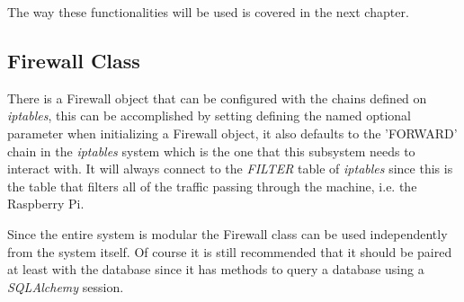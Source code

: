 The way these functionalities will be used is covered in the next chapter.

\subsection{Firewall Class}
\label{chap4:sec:firewall-sys:firewall-class}
There is a Firewall object that can be configured with the chains defined on
\emph{iptables}, this can be accomplished by setting defining the named optional
parameter when initializing a Firewall object, it also defaults to the 'FORWARD'
chain in the \emph{iptables} system which is the one that this subsystem needs
to interact with. It will always connect to the \emph{FILTER} table of
\emph{iptables} since this is the table that filters all of the traffic passing
through the machine, i.e. the Raspberry Pi.

Since the entire system is modular the Firewall class can be used independently
from the system itself. Of course it is still recommended that it should be
paired at least with the database since it has methods to query a database using
a \emph{SQLAlchemy} session.

